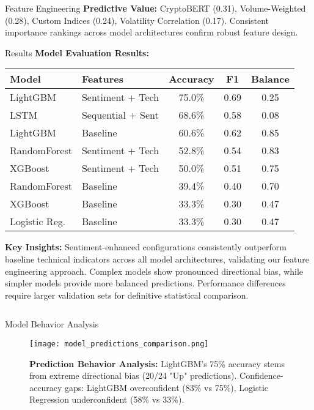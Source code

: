 \documentclass[final]{beamer}
\begin{document}
\begin{frame}[t]
\begin{columns}[T]
\begin{column}{0.5\linewidth}
\begin{block}{Feature Engineering}
        \textbf{Predictive Value:} CryptoBERT (0.31), Volume-Weighted (0.28), Custom Indices (0.24), Volatility Correlation (0.17). Consistent importance rankings across model architectures confirm robust feature design.
    \end{block}
    
    \begin{block}{Results}
        \small
        \textbf{Model Evaluation Results:}
        \centering
        \small
        \begin{tabular}{l l c c c}
        \toprule
        \textbf{Model} & \textbf{Features} & \textbf{Accuracy} & \textbf{F1} & \textbf{Balance} \\
        \midrule
        LightGBM & Sentiment + Tech & 75.0\% & 0.69 & 0.25 \\
        LSTM & Sequential + Sent & 68.6\% & 0.58 & 0.08 \\
        LightGBM & Baseline & 60.6\% & 0.62 & 0.85 \\
        RandomForest & Sentiment + Tech & 52.8\% & 0.54 & 0.83 \\
        XGBoost & Sentiment + Tech & 50.0\% & 0.51 & 0.75 \\
        RandomForest & Baseline & 39.4\% & 0.40 & 0.70 \\
        XGBoost & Baseline & 33.3\% & 0.30 & 0.47 \\
        Logistic Reg. & Baseline & 33.3\% & 0.30 & 0.47 \\
        \bottomrule
        \end{tabular}
        
        \textbf{Key Insights:} Sentiment-enhanced configurations consistently outperform baseline technical indicators across all model architectures, validating our feature engineering approach. Complex models show pronounced directional bias, while simpler models provide more balanced predictions. Performance differences require larger validation sets for definitive statistical comparison.
    \end{block}
\end{column}
\end{columns}

\begin{columns}[T]
\begin{column}{0.48\linewidth}
    \begin{block}{Model Behavior Analysis}
        \small
        \begin{figure}
            \centering
            \texttt{[image: model\_predictions\_comparison.png]}
            \caption{\small\textbf{Prediction Behavior Analysis:} LightGBM's 75\% accuracy stems from extreme directional bias (20/24 "Up" predictions). Confidence-accuracy gaps: LightGBM overconfident (83\% vs 75\%), Logistic Regression underconfident (58\% vs 33\%).}
        \end{figure}
        

\end{block}
\end{column}
\end{columns}
\end{frame}
\end{document}
